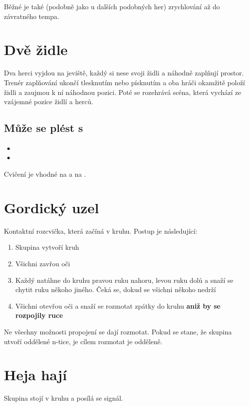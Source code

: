 \documentclass[main.tex]{subfiles}
\begin{document}
Běžné je také (podobně jako u dalších podobných her) zrychlování až do závratného tempa. 
 
 
 
 
\needspace{5cm} \section{Dvě židle} \label{dvě židle} Dva herci vyjdou na jeviště, každý si nese svoji židli a náhodně zaplňují prostor. Trenér zaplňování ukončí tlesknutím nebo písknutím a oba hráči okamžitě položí židli a zaujmou k ní náhodnou pozici. Poté se rozehrává scéna, která vychází ze vzájemné pozice židlí a herců. 
 
\subsection{Může se plést s} \begin{itemize}
\item  {}
\item  {}
\end{itemize}
 
Cvičení je vhodné na  a na . 
 
 
 
\needspace{5cm} \section{Gordický uzel} \label{gordický uzel} Kontaktní rozcvička, která začíná v kruhu. Postup je následující: 
 
\begin{enumerate}
\item  Skupina vytvoří kruh
\item  Všichni zavřou oči
\item  Každý natáhne do kruhu pravou ruku nahoru, levou ruku dolů a snaží se chytit ruku někoho jiného. Čeká se, dokud se všichni někoho nedrží
\item  Všichni otevřou oči a snaží se rozmotat zpátky do kruhu \textbf{aniž by se rozpojily ruce}{}
\end{enumerate}
 
Ne všechny možnosti propojení se dají rozmotat. Pokud se stane, že skupina utvoří oddělené n-tice, je cílem rozmotat je odděleně. 
 
 
 
 
 
\needspace{5cm} \section{Heja hají} \label{heja hají} Skupina stojí v kruhu a posílá se signál. 
 
\end{document}
